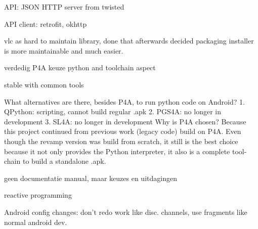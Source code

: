 
API: JSON HTTP server from twisted

API client: retrofit, okhttp


vlc as hard to maintain library, done that
afterwards decided packaging installer is more maintainable and much easier.




verdedig P4A keuze
python and toolchain aspect

stable with common tools

What alternatives are there, besides P4A, to run python code on Android?
1. QPython: scripting, cannot build regular .apk
2. PGS4A: no longer in development
3. SL4A: no longer in development
Why is P4A chosen?
Because this project continued from previous work (legacy code) build on P4A.
Even though the revamp version was build from scratch, it still is the best choice because it not only provides the Python interpreter, it also is a complete tool-chain to build a standalone .apk.



geen documentatie manual, maar keuzes en uitdagingen

reactive programming



Android config changes: don't redo work like disc. channels, use fragments like normal android dev.

